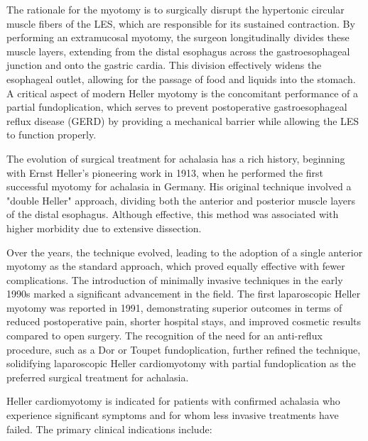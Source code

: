 The rationale for the myotomy is to surgically disrupt the hypertonic circular muscle fibers of the LES, which are responsible for its sustained contraction. By performing an extramucosal myotomy, the surgeon longitudinally divides these muscle layers, extending from the distal esophagus across the gastroesophageal junction and onto the gastric cardia. This division effectively widens the esophageal outlet, allowing for the passage of food and liquids into the stomach. A critical aspect of modern Heller myotomy is the concomitant performance of a partial fundoplication, which serves to prevent postoperative gastroesophageal reflux disease (GERD) by providing a mechanical barrier while allowing the LES to function properly.

The evolution of surgical treatment for achalasia has a rich history, beginning with Ernst Heller's pioneering work in 1913, when he performed the first successful myotomy for achalasia in Germany. His original technique involved a "double Heller" approach, dividing both the anterior and posterior muscle layers of the distal esophagus. Although effective, this method was associated with higher morbidity due to extensive dissection.

Over the years, the technique evolved, leading to the adoption of a single anterior myotomy as the standard approach, which proved equally effective with fewer complications. The introduction of minimally invasive techniques in the early 1990s marked a significant advancement in the field. The first laparoscopic Heller myotomy was reported in 1991, demonstrating superior outcomes in terms of reduced postoperative pain, shorter hospital stays, and improved cosmetic results compared to open surgery. The recognition of the need for an anti-reflux procedure, such as a Dor or Toupet fundoplication, further refined the technique, solidifying laparoscopic Heller cardiomyotomy with partial fundoplication as the preferred surgical treatment for achalasia.

Heller cardiomyotomy is indicated for patients with confirmed achalasia who experience significant symptoms and for whom less invasive treatments have failed. The primary clinical indications include:

